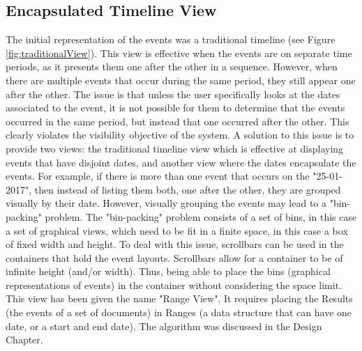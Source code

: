 \subsection{Encapsulated Timeline View}
\par The initial representation of the events was a traditional timeline (see Figure \ref{fig:traditionalView}). This view is effective when the events are on separate time periods, as it presents them one after the other in a sequence. However, when there are multiple events that occur during the same period, they still appear one after the other. The issue is that unless the user specifically looks at the dates associated to the event, it is not possible for them to determine that the events occurred in the same period, but instead that one occurred after the other. This clearly violates the visibility objective of the system. A solution to this issue is to provide two views: the traditional timeline view which is effective at displaying events that have disjoint dates, and another view where the dates encapsulate the events. For example, if there is more than one event that occurs on the "25-01-2017", then instead of listing them both, one after the other, they are grouped visually by their date. However, visually grouping the events may lead to a "bin-packing" problem. The "bin-packing" problem consists of a set of bins, in this case a set of graphical views, which need to be fit in a finite space, in this case a box of fixed width and height. To deal with this issue, scrollbars can be used in the containers that hold the event layouts. Scrollbars allow for a container to be of infinite height (and/or width). Thus, being able to place the bins (graphical representations of events) in the container without considering the space limit. This view has been given the name "Range View". It requires placing the Results (the events of a set of documents) in Ranges (a data structure that can have one date, or a start and end date). The algorithm was discussed in the Design Chapter.

